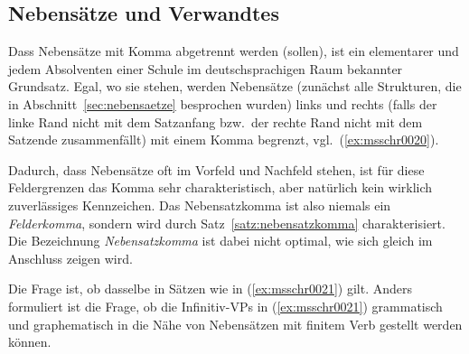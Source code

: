 \subsection{Nebensätze und Verwandtes}

\label{sec:nebensatzschreib}

Dass Nebensätze mit Komma abgetrennt werden (sollen), ist ein elementarer und jedem Absolventen einer Schule im deutschsprachigen Raum bekannter Grundsatz.
Egal, wo sie stehen, werden Nebensätze (zunächst alle Strukturen, die in Abschnitt~\ref{sec:nebensaetze} besprochen wurden) links und rechts (falls der linke Rand nicht mit dem Satzanfang bzw.\ der rechte Rand nicht mit dem Satzende zusammenfällt) mit einem Komma begrenzt, vgl.\ (\ref{ex:msschr0020}).

\begin{exe}
  \ex\label{ex:msschr0020} 
  \begin{xlist}
  \end{xlist}
\end{exe}

Dadurch, dass Nebensätze oft im Vorfeld und Nachfeld stehen, ist für diese Feldergrenzen das Komma sehr charakteristisch, aber natürlich kein wirklich zuverlässiges Kennzeichen.
Das Nebensatzkomma ist also niemals ein \textit{Felderkomma}, sondern wird durch Satz~\ref{satz:nebensatzkomma} charakterisiert.
Die Bezeichnung \textit{Nebensatzkomma} ist dabei nicht optimal, wie sich gleich im Anschluss zeigen wird.


\Enl

Die Frage ist, ob dasselbe in Sätzen wie in (\ref{ex:msschr0021}) gilt.
Anders formuliert ist die Frage, ob die Infinitiv-VPs in (\ref{ex:msschr0021}) grammatisch und graphematisch in die Nähe von Nebensätzen mit finitem Verb gestellt werden können.

\begin{exe}
  \ex\label{ex:msschr0021} 
  \begin{xlist}
  \end{xlist}
\end{exe}

